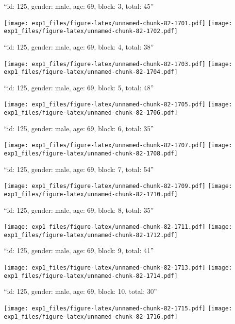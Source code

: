 \documentclass[11pt,,]{article}
\begin{document}
\newpage
[1] 

``id: 125, gender: male, age: 69, block: 3, total: 45''

\texttt{[image: exp1\_files/figure-latex/unnamed-chunk-82-1701.pdf]}
\texttt{[image: exp1\_files/figure-latex/unnamed-chunk-82-1702.pdf]}

\newpage
[1] 

``id: 125, gender: male, age: 69, block: 4, total: 38''

\texttt{[image: exp1\_files/figure-latex/unnamed-chunk-82-1703.pdf]}
\texttt{[image: exp1\_files/figure-latex/unnamed-chunk-82-1704.pdf]}

\newpage
[1] 

``id: 125, gender: male, age: 69, block: 5, total: 48''

\texttt{[image: exp1\_files/figure-latex/unnamed-chunk-82-1705.pdf]}
\texttt{[image: exp1\_files/figure-latex/unnamed-chunk-82-1706.pdf]}

\newpage
[1] 

``id: 125, gender: male, age: 69, block: 6, total: 35''

\texttt{[image: exp1\_files/figure-latex/unnamed-chunk-82-1707.pdf]}
\texttt{[image: exp1\_files/figure-latex/unnamed-chunk-82-1708.pdf]}

\newpage
[1] 

``id: 125, gender: male, age: 69, block: 7, total: 54''

\texttt{[image: exp1\_files/figure-latex/unnamed-chunk-82-1709.pdf]}
\texttt{[image: exp1\_files/figure-latex/unnamed-chunk-82-1710.pdf]}

\newpage
[1] 

``id: 125, gender: male, age: 69, block: 8, total: 35''

\texttt{[image: exp1\_files/figure-latex/unnamed-chunk-82-1711.pdf]}
\texttt{[image: exp1\_files/figure-latex/unnamed-chunk-82-1712.pdf]}

\newpage
[1] 

``id: 125, gender: male, age: 69, block: 9, total: 41''

\texttt{[image: exp1\_files/figure-latex/unnamed-chunk-82-1713.pdf]}
\texttt{[image: exp1\_files/figure-latex/unnamed-chunk-82-1714.pdf]}

\newpage
[1] 

``id: 125, gender: male, age: 69, block: 10, total: 30''

\texttt{[image: exp1\_files/figure-latex/unnamed-chunk-82-1715.pdf]}
\texttt{[image: exp1\_files/figure-latex/unnamed-chunk-82-1716.pdf]}
\end{document}
